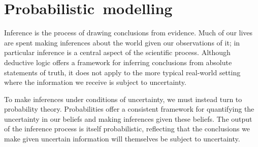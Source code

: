 \chapter{\mbox{Probabilistic modelling}}\label{ch:probabilistic-modelling}

Inference is the process of drawing conclusions from evidence. Much of our lives are spent making inferences about the world given our observations of it; in particular inference is a central aspect of the scientific process. Although deductive logic offers a framework for inferring conclusions from absolute statements of truth, it does not apply to the more typical real-world setting where the information we receive is subject to uncertainty. 

To make inferences under conditions of uncertainty, we must instead turn to probability theory. Probabilities offer a consistent framework for quantifying the uncertainty in our beliefs and making inferences given these beliefs. The output of the inference process is itself probabilistic, reflecting that the conclusions we make given uncertain information will themselves be subject to uncertainty. 


